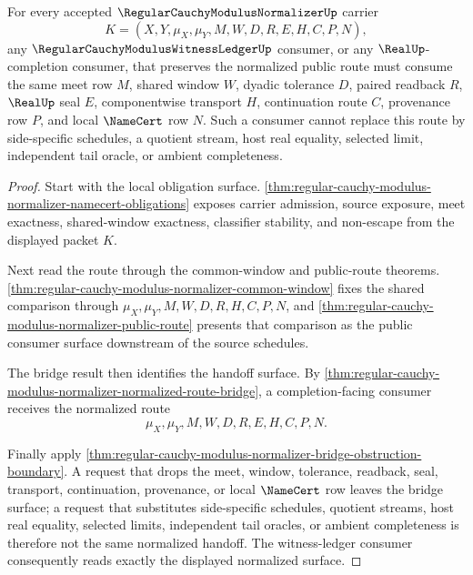 \begin{theorem}
\label{thm:regular-cauchy-modulus-normalizer-mature-witness-ledger-handoff}
For every accepted $\RegularCauchyModulusNormalizerUp$ carrier
$$
K=(X,Y,\mu_X,\mu_Y,M,W,D,R,E,H,C,P,N),
$$
any $\RegularCauchyModulusWitnessLedgerUp$ consumer, or any $\RealUp$-completion consumer, that preserves the normalized public route must consume the same meet row $M$, shared window $W$, dyadic tolerance $D$, paired readback $R$, $\RealUp$ seal $E$, componentwise transport $H$, continuation route $C$, provenance row $P$, and local $\NameCert$ row $N$. Such a consumer cannot replace this route by side-specific schedules, a quotient stream, host real equality, selected limit, independent tail oracle, or ambient completeness.
\end{theorem}
\begin{proof}
Start with the local obligation surface. \autoref{thm:regular-cauchy-modulus-normalizer-namecert-obligations} exposes carrier admission, source exposure, meet exactness, shared-window exactness, classifier stability, and non-escape from the displayed packet $K$.

Next read the route through the common-window and public-route theorems. \autoref{thm:regular-cauchy-modulus-normalizer-common-window} fixes the shared comparison through $\mu_X,\mu_Y,M,W,D,R,H,C,P,N$, and \autoref{thm:regular-cauchy-modulus-normalizer-public-route} presents that comparison as the public consumer surface downstream of the source schedules.

The bridge result then identifies the handoff surface. By \autoref{thm:regular-cauchy-modulus-normalizer-normalized-route-bridge}, a completion-facing consumer receives the normalized route
$$
\mu_X,\mu_Y,M,W,D,R,E,H,C,P,N .
$$

Finally apply \autoref{thm:regular-cauchy-modulus-normalizer-bridge-obstruction-boundary}. A request that drops the meet, window, tolerance, readback, seal, transport, continuation, provenance, or local $\NameCert$ row leaves the bridge surface; a request that substitutes side-specific schedules, quotient streams, host real equality, selected limits, independent tail oracles, or ambient completeness is therefore not the same normalized handoff. The witness-ledger consumer consequently reads exactly the displayed normalized surface.
\end{proof}

